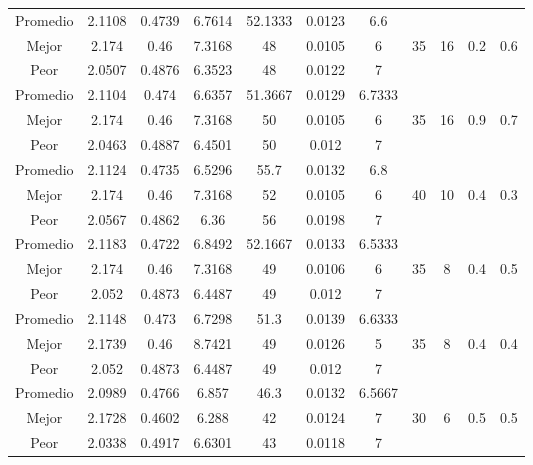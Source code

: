 \begin{table}[h!]
\begin{center}
\begin{tabular}{|c|c|c|c|c|c|c|c|c|c|c|}
        \hline
        \hline
            Promedio  & 2.1108 & 0.4739 & 6.7614 & 52.1333 & 0.0123 & 6.6 &  &  &  & \\
            \cline{1-7}
            Mejor & 2.174 & 0.46  & 7.3168 & 48 & 0.0105 & 6 & 35 & 16 & 0.2 & 0.6\\
            \cline{1-7}
            Peor & 2.0507 & 0.4876  & 6.3523 & 48 & 0.0122 & 7 &  &  &  & \\
        \hline
        \hline
            Promedio  & 2.1104 & 0.474 & 6.6357 & 51.3667 & 0.0129 & 6.7333 &  &  &  & \\
            \cline{1-7}
            Mejor & 2.174 & 0.46  & 7.3168 & 50 & 0.0105 & 6 & 35 & 16 & 0.9 & 0.7\\
            \cline{1-7}
            Peor & 2.0463 & 0.4887  & 6.4501 & 50 & 0.012 & 7 &  &  &  & \\
        \hline
        \hline
            Promedio  & 2.1124 & 0.4735 & 6.5296 & 55.7 & 0.0132 & 6.8 &  &  &  & \\
            \cline{1-7}
            Mejor & 2.174 & 0.46  & 7.3168 & 52 & 0.0105 & 6 & 40 & 10 & 0.4 & 0.3\\
            \cline{1-7}
            Peor & 2.0567 & 0.4862  & 6.36 & 56 & 0.0198 & 7 &  &  &  & \\
        \hline
        \hline
            Promedio  & 2.1183 & 0.4722 & 6.8492 & 52.1667 & 0.0133 & 6.5333 &  &  &  & \\
            \cline{1-7}
            Mejor & 2.174 & 0.46  & 7.3168 & 49 & 0.0106 & 6 & 35 & 8 & 0.4 & 0.5\\
            \cline{1-7}
            Peor & 2.052 & 0.4873  & 6.4487 & 49 & 0.012 & 7 &  &  &  & \\
        \hline
        \hline
            Promedio  & 2.1148 & 0.473 & 6.7298 & 51.3 & 0.0139 & 6.6333 &  &  &  & \\
            \cline{1-7}
            Mejor & 2.1739 & 0.46  & 8.7421 & 49 & 0.0126 & 5 & 35 & 8 & 0.4 & 0.4\\
            \cline{1-7}
            Peor & 2.052 & 0.4873  & 6.4487 & 49 & 0.012 & 7 &  &  &  & \\
        \hline
        \hline
            Promedio  & 2.0989 & 0.4766 & 6.857 & 46.3 & 0.0132 & 6.5667 &  &  &  & \\
            \cline{1-7}
            Mejor & 2.1728 & 0.4602  & 6.288 & 42 & 0.0124 & 7 & 30 & 6 & 0.5 & 0.5\\
            \cline{1-7}
            Peor & 2.0338 & 0.4917  & 6.6301 & 43 & 0.0118 & 7 &  &  &  & \\

\end{tabular}
\end{center}
\end{table}
